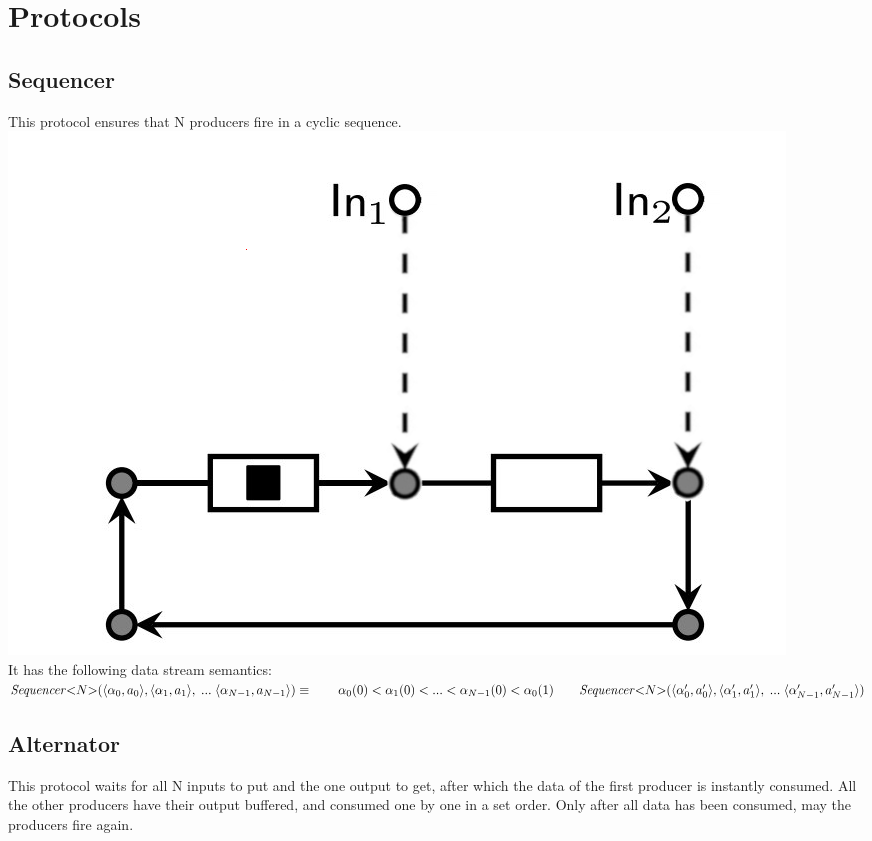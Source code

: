 \section{Protocols}
\subsection{Sequencer}
This protocol ensures that N producers fire in a cyclic sequence.\\

\includegraphics[]{img/seq.png}\\
%
It has the following data stream semantics:\\
%
$
\mathit{Sequencer}{<}N{>}(\langle \alpha_0, a_0 \rangle, \langle \alpha_1, a_1 \rangle,\;...\; \langle \alpha_{N-1}, a_{N-1} \rangle) \equiv \\
\hphantom \qquad  \alpha_0(0) < \alpha_1(0) < ... < \alpha_{N-1}(0) < \alpha_0(1) \\
\hphantom \qquad \mathit{Sequencer}{<}N{>}(\langle \alpha_0', a_0' \rangle, \langle \alpha_1', a_1' \rangle,\;...\; \langle \alpha_{N-1}', a_{N-1}' \rangle)
$


\subsection{Alternator}
This protocol waits for all N inputs to put and the one output to get, after which the data of the first producer is instantly consumed.
All the other producers have their output buffered, and consumed one by one in a set order.
Only after all data has been consumed, may the producers fire again.\\

